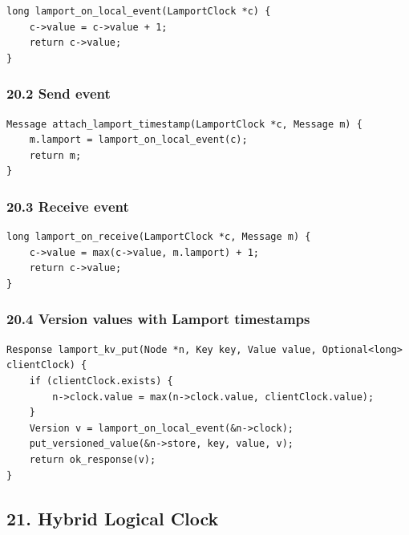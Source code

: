 \documentclass[10pt,letterpaper]{article}
\begin{document}
\begin{verbatim}
long lamport_on_local_event(LamportClock *c) {
    c->value = c->value + 1;
    return c->value;
}
\end{verbatim}

\subsubsection*{20.2 Send event}

\begin{verbatim}
Message attach_lamport_timestamp(LamportClock *c, Message m) {
    m.lamport = lamport_on_local_event(c);
    return m;
}
\end{verbatim}

\subsubsection*{20.3 Receive event}

\begin{verbatim}
long lamport_on_receive(LamportClock *c, Message m) {
    c->value = max(c->value, m.lamport) + 1;
    return c->value;
}
\end{verbatim}

\subsubsection*{20.4 Version values with Lamport timestamps}

\begin{verbatim}
Response lamport_kv_put(Node *n, Key key, Value value, Optional<long> clientClock) {
    if (clientClock.exists) {
        n->clock.value = max(n->clock.value, clientClock.value);
    }
    Version v = lamport_on_local_event(&n->clock);
    put_versioned_value(&n->store, key, value, v);
    return ok_response(v);
}
\end{verbatim}

\subsection*{21. Hybrid Logical Clock}
\end{document}
